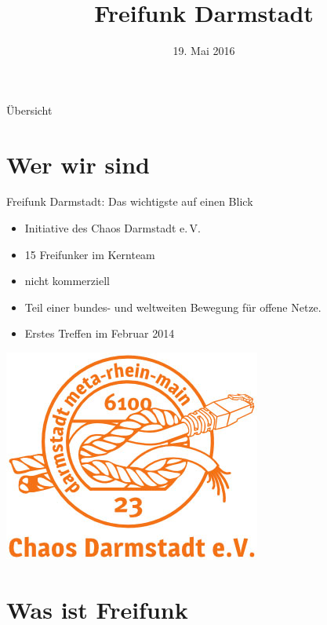 \documentclass[10pt]{beamer}
\title{Freifunk Darmstadt}
\author{}
\institute[Inst.]{eine Initiative des Chaos Darmstadt e.V.}
\date{\footnotesize 19. Mai 2016}
\begin{document}
  \begin{frame}
    \centering
    \maketitle
  \end{frame}
  
  \begin{frame}{Übersicht}
    \tableofcontents
  \end{frame}
  
  \section{Wer wir sind}
  
  \begin{frame}{Freifunk Darmstadt: Das wichtigste auf einen Blick}
    \begin{center}
    \begin{itemize}
	  \item Initiative des Chaos Darmstadt e.\,V.
      \item 15 Freifunker im Kernteam
	  \item nicht kommerziell
	  \item Teil einer bundes- und weltweiten Bewegung für offene Netze.
	  \item Erstes Treffen im Februar 2014
    \end{itemize}
    \vfill
    \includegraphics[width=.3\textheight]{images/cda}
    \end{center}
  \end{frame}

  
  \section{Was ist Freifunk}
  
\end{document}
